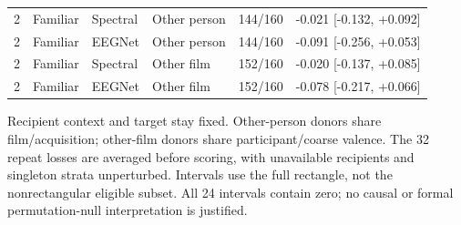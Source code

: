 \begin{table}[tbp]
\begin{tabular}{rlllll}
2 & Familiar & Spectral & Other person & 144/160 & -0.021 [-0.132, +0.092] \\
2 & Familiar & EEGNet & Other person & 144/160 & -0.091 [-0.256, +0.053] \\
2 & Familiar & Spectral & Other film & 152/160 & -0.020 [-0.137, +0.085] \\
2 & Familiar & EEGNet & Other film & 152/160 & -0.078 [-0.217, +0.066] \\
\bottomrule
\end{tabular}
\par\medskip\begin{minipage}{0.97\linewidth}\footnotesize Recipient context and target stay fixed. Other-person donors share film/acquisition; other-film donors share participant/coarse valence. The 32 repeat losses are averaged before scoring, with unavailable recipients and singleton strata unperturbed. Intervals use the full rectangle, not the nonrectangular eligible subset. All 24 intervals contain zero; no causal or formal permutation-null interpretation is justified.\end{minipage}
\end{table}
